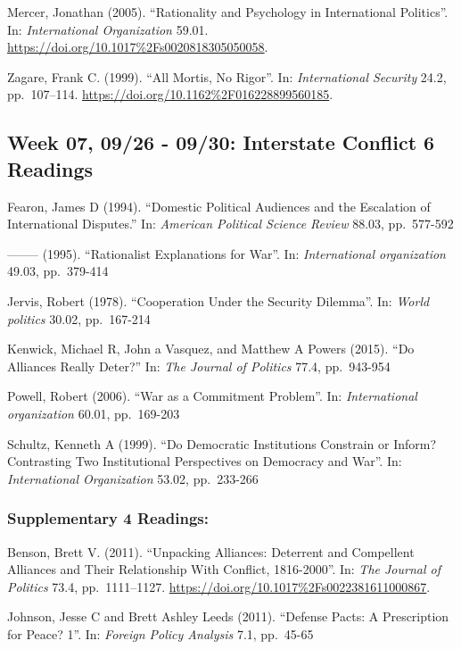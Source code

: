 \documentclass[10pt,]{article}
\begin{document}
Mercer, Jonathan (2005). ``Rationality and Psychology in International
Politics''. In: \emph{International Organization} 59.01.
\url{https://doi.org/10.1017\%2Fs0020818305050058}.

Zagare, Frank C. (1999). ``All Mortis, No Rigor''. In:
\emph{International Security} 24.2, pp.~107--114.
\url{https://doi.org/10.1162\%2F016228899560185}.

\subsection{Week 07, 09/26 - 09/30: Interstate Conflict \textbar{} 6
Readings}\label{week-07-0926---0930-interstate-conflict-6-readings}

Fearon, James D (1994). ``Domestic Political Audiences and the
Escalation of International Disputes.'' In:
\emph{American Political Science Review} 88.03, pp.~577-592

-------- (1995). ``Rationalist Explanations for War''. In:
\emph{International organization} 49.03, pp.~379-414

Jervis, Robert (1978). ``Cooperation Under the Security Dilemma''. In:
\emph{World politics} 30.02, pp.~167-214

Kenwick, Michael R, John a Vasquez, and Matthew A Powers (2015). ``Do
Alliances Really Deter?'' In: \emph{The Journal of Politics} 77.4,
pp.~943-954

Powell, Robert (2006). ``War as a Commitment Problem''. In:
\emph{International organization} 60.01, pp.~169-203

Schultz, Kenneth A (1999). ``Do Democratic Institutions Constrain or
Inform? Contrasting Two Institutional Perspectives on Democracy and
War''. In: \emph{International Organization} 53.02, pp.~233-266

\subsubsection{Supplementary \textbar{} 4
Readings:}\label{supplementary-4-readings-1}

Benson, Brett V. (2011). ``Unpacking Alliances: Deterrent and Compellent
Alliances and Their Relationship With Conflict, 1816-2000''. In:
\emph{The Journal of Politics} 73.4, pp.~1111--1127.
\url{https://doi.org/10.1017\%2Fs0022381611000867}.

Johnson, Jesse C and Brett Ashley Leeds (2011). ``Defense Pacts: A
Prescription for Peace? 1''. In: \emph{Foreign Policy Analysis} 7.1,
pp.~45-65
\end{document}
